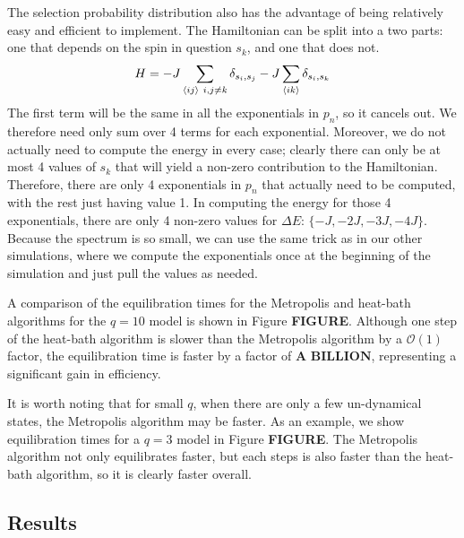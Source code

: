 \documentclass[twocolumn,aps,prl]{revtex4-1} %
\begin{document}
The selection probability distribution also has the advantage of being relatively easy and efficient to implement. The Hamiltonian can be split into a two parts: one that depends on the spin in question $s_k$, and one that does not.
\begin{equation}
	H = -J\sum_{\braket{ij}\ i,j\neq k}\delta_{s_i,s_j} - J\sum_{\braket{ik}}\delta_{s_i,s_k}
\end{equation}
The first term will be the same in all the exponentials in $p_n$, so it cancels out. We therefore need only sum over 4 terms for each exponential. Moreover, we do not actually need to compute the energy in every case; clearly there can only be at most 4 values of $s_k$ that will yield a non-zero contribution to the Hamiltonian. Therefore, there are only 4 exponentials in $p_n$ that actually need to be computed, with the rest just having value 1. In computing the energy for those 4 exponentials, there are only 4 non-zero values for $\Delta E$: $\{-J, -2J, -3J, -4J\}$. Because the spectrum is so small, we can use the same trick as in our other simulations, where we compute the exponentials once at the beginning of the simulation and just pull the values as needed.

A comparison of the equilibration times for the Metropolis and heat-bath algorithms for the $q = 10$ model is shown in Figure \textbf{FIGURE}. Although one step of the heat-bath algorithm is slower than the Metropolis algorithm by a $\mathcal{O}(1)$ factor, the equilibration time is faster by a factor of $\textbf{A BILLION}$, representing a significant gain in efficiency.

It is worth noting that for small $q$, when there are only a few un-dynamical states, the Metropolis algorithm may be faster. As an example, we show equilibration times for a $q = 3$ model in Figure \textbf{FIGURE}. The Metropolis algorithm not only equilibrates faster, but each steps is also faster than the heat-bath algorithm, so it is clearly faster overall. 

\subsection{Results}
 
\end{document}
